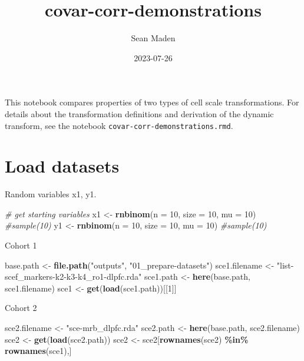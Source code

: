\documentclass[
]{article}
\title{covar-corr-demonstrations}
\author{Sean Maden}
\date{2023-07-26}
\newenvironment{Shaded}{\begin{snugshade}}{\end{snugshade}}
\newcommand{\AttributeTok}[1]{\textcolor[rgb]{0.13,0.29,0.53}{#1}}
\newcommand{\CommentTok}[1]{\textcolor[rgb]{0.56,0.35,0.01}{\textit{#1}}}
\newcommand{\DecValTok}[1]{\textcolor[rgb]{0.00,0.00,0.81}{#1}}
\newcommand{\FunctionTok}[1]{\textcolor[rgb]{0.13,0.29,0.53}{\textbf{#1}}}
\newcommand{\NormalTok}[1]{#1}
\newcommand{\OtherTok}[1]{\textcolor[rgb]{0.56,0.35,0.01}{#1}}
\newcommand{\SpecialCharTok}[1]{\textcolor[rgb]{0.81,0.36,0.00}{\textbf{#1}}}
\newcommand{\StringTok}[1]{\textcolor[rgb]{0.31,0.60,0.02}{#1}}
\begin{document}
\maketitle

This notebook compares properties of two types of cell scale
transformations. For details about the transformation definitions and
derivation of the dynamic transform, see the notebook
\texttt{covar-corr-demonstrations.rmd}.

\hypertarget{load-datasets}{%
\section{Load datasets}\label{load-datasets}}

Random variables x1, y1.

\begin{Shaded}
\begin{Highlighting}[]
\CommentTok{\# get starting variables}
\NormalTok{x1 }\OtherTok{\textless{}{-}} \FunctionTok{rnbinom}\NormalTok{(}\AttributeTok{n =} \DecValTok{10}\NormalTok{, }\AttributeTok{size =} \DecValTok{10}\NormalTok{, }\AttributeTok{mu =} \DecValTok{10}\NormalTok{)  }\CommentTok{\#sample(10)}
\NormalTok{y1 }\OtherTok{\textless{}{-}} \FunctionTok{rnbinom}\NormalTok{(}\AttributeTok{n =} \DecValTok{10}\NormalTok{, }\AttributeTok{size =} \DecValTok{10}\NormalTok{, }\AttributeTok{mu =} \DecValTok{10}\NormalTok{) }\CommentTok{\#sample(10)}
\end{Highlighting}
\end{Shaded}

Cohort 1

\begin{Shaded}
\begin{Highlighting}[]
\NormalTok{base.path }\OtherTok{\textless{}{-}} \FunctionTok{file.path}\NormalTok{(}\StringTok{"outputs"}\NormalTok{, }\StringTok{"01\_prepare{-}datasets"}\NormalTok{)}
\NormalTok{sce1.filename }\OtherTok{\textless{}{-}} \StringTok{"list{-}scef\_markers{-}k2{-}k3{-}k4\_ro1{-}dlpfc.rda"}
\NormalTok{sce1.path }\OtherTok{\textless{}{-}} \FunctionTok{here}\NormalTok{(base.path, sce1.filename)}
\NormalTok{sce1 }\OtherTok{\textless{}{-}} \FunctionTok{get}\NormalTok{(}\FunctionTok{load}\NormalTok{(sce1.path))[[}\DecValTok{1}\NormalTok{]]}
\end{Highlighting}
\end{Shaded}

Cohort 2

\begin{Shaded}
\begin{Highlighting}[]
\NormalTok{sce2.filename }\OtherTok{\textless{}{-}} \StringTok{"sce{-}mrb\_dlpfc.rda"}
\NormalTok{sce2.path }\OtherTok{\textless{}{-}} \FunctionTok{here}\NormalTok{(base.path, sce2.filename)}
\NormalTok{sce2 }\OtherTok{\textless{}{-}} \FunctionTok{get}\NormalTok{(}\FunctionTok{load}\NormalTok{(sce2.path))}
\NormalTok{sce2 }\OtherTok{\textless{}{-}}\NormalTok{ sce2[}\FunctionTok{rownames}\NormalTok{(sce2) }\SpecialCharTok{\%in\%} \FunctionTok{rownames}\NormalTok{(sce1),]}
\end{Highlighting}
\end{Shaded}
\end{document}
